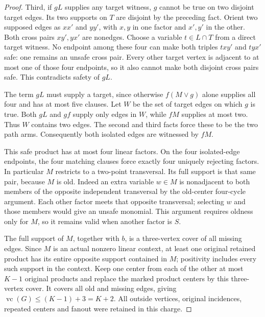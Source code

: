 \documentclass[11pt]{article}
\newcommand{\vc}{\operatorname{vc}}
\theoremstyle{definition}
\theoremstyle{remark}
\begin{document}
\begin{proof}
Third, if $gL$ supplies any target witness, $g$ cannot be true on two disjoint target edges. Its two supports on $T$ are disjoint by the preceding fact. Orient two supposed edges as $xx'$ and $yy'$, with $x,y$ in one factor and $x',y'$ in the other. Both cross pairs $xy',yx'$ are nonedges. Choose a variable $t\in L\cap T$ from a direct target witness. No endpoint among these four can make both triples $txy'$ and $tyx'$ safe: one remains an unsafe cross pair. Every other target vertex is adjacent to at most one of those four endpoints, so it also cannot make both disjoint cross pairs safe. This contradicts safety of $gL$.

The term $gL$ must supply a target, since otherwise $f(M\vee g)$ alone supplies all four and has at most five clauses. Let $W$ be the set of target edges on which $g$ is true. Both $gL$ and $gf$ supply only edges in $W$, while $fM$ supplies at most two. Thus $W$ contains two edges. The second and third facts force these to be the two path arms. Consequently both isolated edges are witnessed by $fM$.

This safe product has at most four linear factors. On the four isolated-edge endpoints, the four matching clauses force exactly four uniquely rejecting factors. In particular $M$ restricts to a two-point transversal. Its full support is that same pair, because $M$ is old. Indeed an extra variable $w\in M$ is nonadjacent to both members of the opposite independent transversal by the old-center four-cycle argument. Each other factor meets that opposite transversal; selecting $w$ and those members would give an unsafe monomial. This argument requires oldness only for $M$, so it remains valid when another factor is $S$.

The full support of $M$, together with $b$, is a three-vertex cover of all missing edges. Since $M$ is an actual nonzero linear context, at least one original retained product has its entire opposite support contained in $M$; positivity includes every such support in the context. Keep one center from each of the other at most $K-1$ original products and replace the marked product centers by this three-vertex cover. It covers all old and missing edges, giving $\vc(G)\le(K-1)+3=K+2$. All outside vertices, original incidences, repeated centers and fanout were retained in this charge.
\end{proof}
\end{document}
